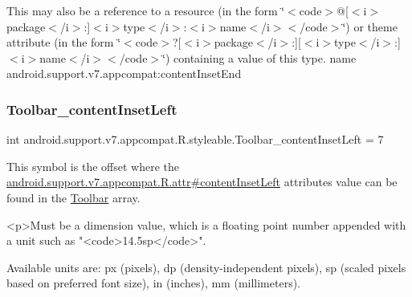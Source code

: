 This may also be a reference to a resource (in the form \char`\"{}$<$code$>$@\mbox{[}$<$i$>$package$<$/i$>$\+:\mbox{]}$<$i$>$type$<$/i$>$\+:$<$i$>$name$<$/i$>$$<$/code$>$\char`\"{}) or theme attribute (in the form \char`\"{}$<$code$>$?\mbox{[}$<$i$>$package$<$/i$>$\+:\mbox{]}\mbox{[}$<$i$>$type$<$/i$>$\+:\mbox{]}$<$i$>$name$<$/i$>$$<$/code$>$\char`\"{}) containing a value of this type.  name android.\+support.\+v7.\+appcompat\+:content\+Inset\+End \mbox{\label{classandroid_1_1support_1_1v7_1_1appcompat_1_1R_1_1styleable_a70db7f911845893b9659eba7d5388946}} 
\subsubsection{\texorpdfstring{Toolbar\+\_\+content\+Inset\+Left}{Toolbar\_contentInsetLeft}}
{\footnotesize\ttfamily int android.\+support.\+v7.\+appcompat.\+R.\+styleable.\+Toolbar\+\_\+content\+Inset\+Left = 7\hspace{0.3cm}{\ttfamily [static]}}

This symbol is the offset where the \hyperlink{classandroid_1_1support_1_1v7_1_1appcompat_1_1R_1_1attr_a53c50cac162dcc7adf7d93be2d2bce5c}{android.\+support.\+v7.\+appcompat.\+R.\+attr\#content\+Inset\+Left} attribute\textquotesingle{}s value can be found in the \hyperlink{classandroid_1_1support_1_1v7_1_1appcompat_1_1R_1_1styleable_a2daba9587ef9f700f2d54cf13435cb32}{Toolbar} array.

\begin{DoxyVerb}      <p>Must be a dimension value, which is a floating point number appended with a unit such as "<code>14.5sp</code>".
\end{DoxyVerb}
 Available units are\+: px (pixels), dp (density-\/independent pixels), sp (scaled pixels based on preferred font size), in (inches), mm (millimeters). 

